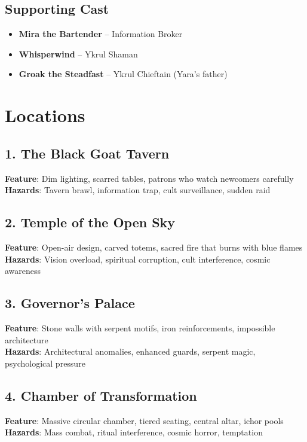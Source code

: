 \documentclass[11pt]{article}
\begin{document}
\subsection*{Supporting Cast}
\begin{itemize}
    \item \textbf{Mira the Bartender} – Information Broker
    \item \textbf{Whisperwind} – Ykrul Shaman
    \item \textbf{Groak the Steadfast} – Ykrul Chieftain (Yara's father)
\end{itemize}

\section*{Locations}

\subsection*{1. The Black Goat Tavern}
\textbf{Feature}: Dim lighting, scarred tables, patrons who watch newcomers carefully\\
\textbf{Hazards}: Tavern brawl, information trap, cult surveillance, sudden raid

\subsection*{2. Temple of the Open Sky}
\textbf{Feature}: Open-air design, carved totems, sacred fire that burns with blue flames\\
\textbf{Hazards}: Vision overload, spiritual corruption, cult interference, cosmic awareness

\subsection*{3. Governor's Palace}
\textbf{Feature}: Stone walls with serpent motifs, iron reinforcements, impossible architecture\\
\textbf{Hazards}: Architectural anomalies, enhanced guards, serpent magic, psychological pressure

\subsection*{4. Chamber of Transformation}
\textbf{Feature}: Massive circular chamber, tiered seating, central altar, ichor pools\\
\textbf{Hazards}: Mass combat, ritual interference, cosmic horror, temptation
\end{document}
